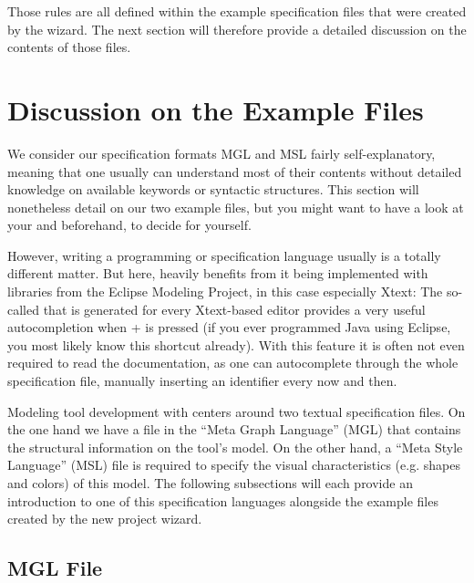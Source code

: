 \documentclass[a4paper,american,12pt]{scrreprt}
\begin{document}
Those rules are all defined within the example \cinco specification files that
were created by the wizard. The next section will therefore provide a detailed
discussion on the contents of those files.

\section{Discussion on the Example Files}
\label{sec:examplefiles}

We consider our specification formats MGL and MSL fairly self-explanatory,
meaning that one usually can understand most of their contents without detailed
knowledge on available keywords or syntactic structures. This section
will nonetheless detail on our two example files, but you might want to have a look at
your  and  beforehand, to decide for
yourself. 

However, writing a programming or specification language usually is a totally
different matter. But here, \cinco heavily benefits from it being implemented
with libraries from the Eclipse Modeling Project, in this case especially Xtext:
The so-called  that is generated for every Xtext-based
editor provides a very useful autocompletion when
+ is pressed (if you ever programmed Java using
Eclipse, you most likely know this shortcut already). With this feature it is
often not even required to read the documentation, as one can autocomplete
through the whole specification file, manually inserting an identifier every now and
then.

Modeling tool development with \cinco centers around two textual specification
files. On the one hand we have a file in the ``Meta Graph Language'' (MGL) that
contains the structural information on the tool's model. On the other hand, a
``Meta Style Language'' (MSL) file\footnotemark{} is required to specify the
visual characteristics (e.g.  shapes and colors) of this model. The following
subsections will each provide an introduction to one of this specification
languages alongside the example files created by the new project wizard.


\subsection{MGL File}
\end{document}
